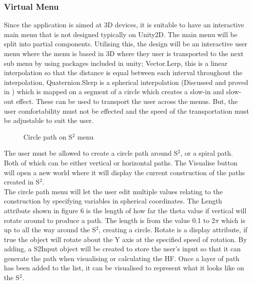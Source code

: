 \documentclass[12pt]{article} %
\begin{document}
\begin{flushleft}
\subsubsection{Virtual Menu} %
Since the application is aimed at 3D devices, it is suitable to have an interactive main menu that is not designed typically on Unity2D. The main menu will be split into partial components. Utilising this, the design will be an interactive user menu where the menu is based in 3D where they user is transported to the next sub menu by using packages included in unity; Vector.Lerp, this is a linear interpolation so that the distance is equal between each interval throughout the interpolation, Quaternion.Slerp is a spherical interpolation (Discussed and proved in \cite{Ken:anime}) which is mapped on a segment of a circle which creates a slow-in and slow-out effect. These can be used to transport the user across the menus. But, the user comfortability must not be effected and the speed of the transportation must be adjustable to suit the user.
\begin{figure}[H] %
\caption{Circle path on S$^{2}$ menu}
\label{fig:speciation}
\end{figure}
The user must be allowed to create a circle path around S$^{2}$, or a spiral path. Both of which can be either vertical or horizontal paths. The Visualise button will open a new world where it will display the current construction of the paths created in S$^{2}$.\\
The circle path menu will let the user edit multiple values relating to the construction by specifying variables in spherical coordinates. The Length attribute shown in figure 6  is the length of how far the theta value if vertical will rotate around to produce a path. The length is from the value 0.1 to 2$\pi$ which is up to all the way around the S$^{2}$, creating a circle. Rotate is a display attribute, if true the object will rotate about the Y axis at the specified speed of rotation. By adding, a S2Input object will be created to store the user's input so that it can generate the path when visualising or calculating the HF. Once a layer of path has been added to the list, it can be visualised to represent what it looks like on the S$^{2}$. 
\newpage

\end{flushleft}
\end{document}
